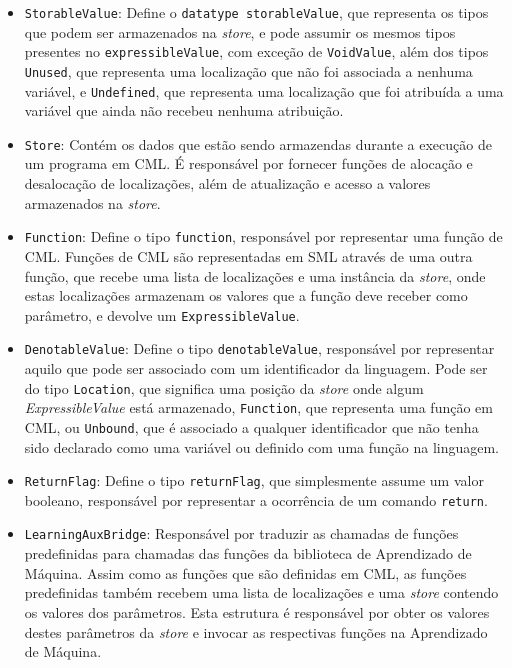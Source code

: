 \documentclass[12pt]{article}
\begin{document}
\begin{enumerate}
\begin{itemize}
\item \texttt{StorableValue}: Define o \texttt{datatype storableValue}, que representa os tipos que podem ser armazenados na \textit{store}, e pode assumir os mesmos tipos presentes no \texttt{expressibleValue}, com exceção de \texttt{VoidValue}, além dos tipos \texttt{Unused}, que representa uma localização que não foi associada a nenhuma variável, e \texttt{Undefined}, que representa uma localização que foi atribuída a uma variável que ainda não recebeu nenhuma atribuição.

\item \texttt{Store}: Contém os dados que estão sendo armazendas durante a execução de um programa em CML. É responsável por fornecer funções de alocação e desalocação de localizações, além de atualização e acesso a valores armazenados na \textit{store}.

\item \texttt{Function}: Define o tipo \texttt{function}, responsável por representar uma função de CML. Funções de CML são representadas em SML através de uma outra função, que recebe uma lista de localizações e uma instância da \textit{store}, onde estas localizações armazenam os valores que a função deve receber como parâmetro, e devolve um \texttt{ExpressibleValue}.

\item \texttt{DenotableValue}: Define o tipo \texttt{denotableValue}, responsável por representar aquilo que pode ser associado com um identificador da linguagem. Pode ser do tipo \texttt{Location}, que significa uma posição da \textit{store} onde algum  \textit{ExpressibleValue} está armazenado, \texttt{Function}, que representa uma função em CML, ou \texttt{Unbound}, que é associado a qualquer identificador que não tenha sido declarado como uma variável ou definido com uma função na linguagem.

\item \texttt{ReturnFlag}: Define o tipo \texttt{returnFlag}, que simplesmente assume um valor booleano, responsável por representar a ocorrência de um comando \texttt{return}.

\item \texttt{LearningAuxBridge}: Responsável por traduzir as chamadas de funções predefinidas para chamadas das funções da biblioteca de Aprendizado de Máquina. Assim como as funções que são definidas em CML, as funções predefinidas também recebem uma lista de localizações e uma \textit{store} contendo os valores dos parâmetros. Esta estrutura é responsável por obter os valores destes parâmetros da \textit{store} e invocar as respectivas funções na Aprendizado de Máquina.


\end{itemize}
\end{enumerate}
\end{document}
